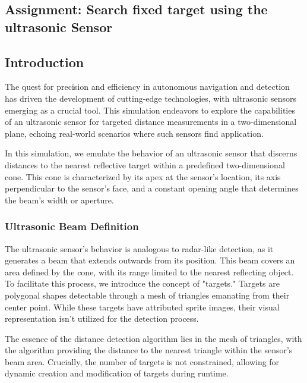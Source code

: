 \begin{center}
\section{Assignment: Search fixed target using the ultrasonic Sensor}
\end{center}
\label{sec:first-n-follow}

\subsection{Introduction}

The quest for precision and efficiency in autonomous navigation and detection has driven the development of cutting-edge technologies, with ultrasonic sensors emerging as a crucial tool. This simulation endeavors to explore the capabilities of an ultrasonic sensor for targeted distance measurements in a two-dimensional plane, echoing real-world scenarios where such sensors find application.

In this simulation, we emulate the behavior of an ultrasonic sensor that discerns distances to the nearest reflective target within a predefined two-dimensional cone. This cone is characterized by its apex at the sensor's location, its axis perpendicular to the sensor's face, and a constant opening angle that determines the beam's width or aperture.

\subsubsection{Ultrasonic Beam Definition}

The ultrasonic sensor's behavior is analogous to radar-like detection, as it generates a beam that extends outwards from its position. This beam covers an area defined by the cone, with its range limited to the nearest reflecting object. To facilitate this process, we introduce the concept of "targets." Targets are polygonal shapes detectable through a mesh of triangles emanating from their center point. While these targets have attributed sprite images, their visual representation isn't utilized for the detection process.

The essence of the distance detection algorithm lies in the mesh of triangles, with the algorithm providing the distance to the nearest triangle within the sensor's beam area. Crucially, the number of targets is not constrained, allowing for dynamic creation and modification of targets during runtime.

